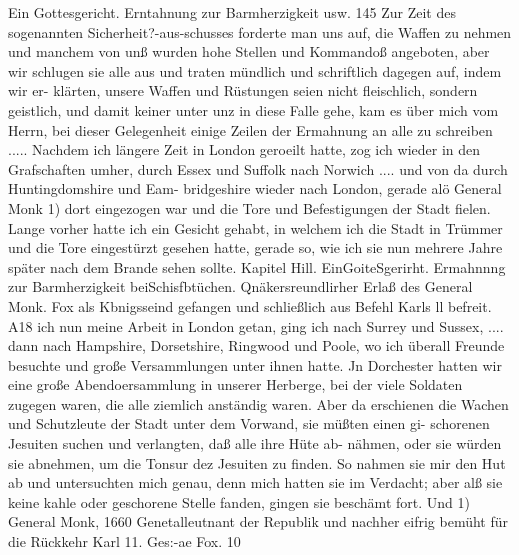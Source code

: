 Ein Gottesgericht. Erntahnung zur Barmherzigkeit usw. 145
Zur Zeit des sogenannten Sicherheit?-aus-schusses forderte man uns
auf, die Waffen zu nehmen und manchem von unß wurden hohe
Stellen und Kommandoß angeboten, aber wir schlugen sie alle aus
und traten mündlich und schriftlich dagegen auf, indem wir er-
klärten, unsere Waffen und Rüstungen seien nicht fleischlich, sondern
geistlich, und damit keiner unter unz in diese Falle gehe, kam es
über mich vom Herrn, bei dieser Gelegenheit einige Zeilen der
Ermahnung an alle zu schreiben .....
Nachdem ich längere Zeit in London geroeilt hatte, zog ich
wieder in den Grafschaften umher, durch Essex und Suffolk nach
Norwich .... und von da durch Huntingdomshire und Eam-
bridgeshire wieder nach London, gerade alö General Monk 1) dort
eingezogen war und die Tore und Befestigungen der Stadt
fielen. Lange vorher hatte ich ein Gesicht gehabt, in welchem
ich die Stadt in Trümmer und die Tore eingestürzt gesehen
hatte, gerade so, wie ich sie nun mehrere Jahre später nach dem
Brande sehen sollte.
Kapitel Hill.
EinGoiteSgerirht. Ermahnnng zur Barmherzigkeit beiSchisfbtüchen.
Qnäkersreundlirher Erlaß des General Monk. Fox als Kbnigsseind
gefangen und schließlich aus Befehl Karls ll befreit.
A18 ich nun meine Arbeit in London getan, ging ich nach
Surrey und Sussex, .... dann nach Hampshire, Dorsetshire,
Ringwood und Poole, wo ich überall Freunde besuchte und große
Versammlungen unter ihnen hatte.
Jn Dorchester hatten wir eine große Abendoersammlung in
unserer Herberge, bei der viele Soldaten zugegen waren, die alle
ziemlich anständig waren. Aber da erschienen die Wachen und
Schutzleute der Stadt unter dem Vorwand, sie müßten einen gi-
schorenen Jesuiten suchen und verlangten, daß alle ihre Hüte ab-
nähmen, oder sie würden sie abnehmen, um die Tonsur dez Jesuiten
zu finden. So nahmen sie mir den Hut ab und untersuchten
mich genau, denn mich hatten sie im Verdacht; aber alß sie keine
kahle oder geschorene Stelle fanden, gingen sie beschämt fort. Und
1) General Monk, 1660 Genetalleutnant der Republik und nachher eifrig
bemüht für die Rückkehr Karl 11.
Ges:-ae Fox. 10


